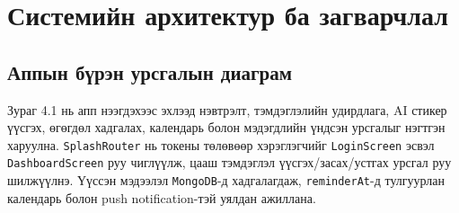 \section{Системийн архитектур ба загварчлал}
\label{sec:system_design}

\subsection{Аппын бүрэн урсгалын диаграм} Зураг 4.1 нь апп нээгдэхээс эхлээд нэвтрэлт, тэмдэглэлийн удирдлага, AI стикер үүсгэх, өгөгдөл хадгалах, календарь болон мэдэгдлийн үндсэн урсгалыг нэгтгэн харуулна. \texttt{SplashRouter} нь токены төлөвөөр хэрэглэгчийг \texttt{LoginScreen} эсвэл \texttt{DashboardScreen} руу чиглүүлж, цааш тэмдэглэл үүсгэх/засах/устгах урсгал руу шилжүүлнэ. Үүссэн мэдээлэл \texttt{MongoDB}-д хадгалагдаж, \texttt{reminderAt}-д тулгуурлан календарь болон push notification-тэй уялдан ажиллана.

